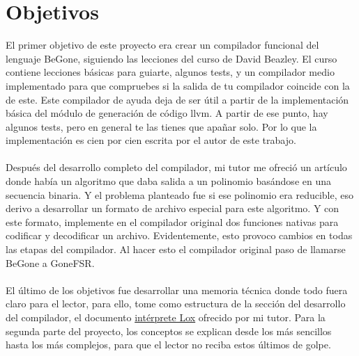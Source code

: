 \section{Objetivos}
El primer objetivo de este proyecto era crear un compilador funcional del lenguaje BeGone, siguiendo las lecciones del curso de David Beazley. El curso contiene lecciones básicas para guiarte, algunos tests, y un compilador medio implementado para que compruebes si la salida de tu compilador coincide con la de este. Este compilador de ayuda deja de ser útil a partir de la implementación básica del módulo de generación de código llvm. A partir de ese punto, hay algunos tests, pero en general te las tienes que apañar solo. Por lo que la implementación es cien por cien escrita por el autor de este trabajo.\\\\
Después del desarrollo completo del compilador, mi tutor me ofreció un artículo \cite{limniotis2007nonlinear} donde había un algoritmo que daba salida a un polinomio basándose en una secuencia binaria. Y el problema planteado fue si ese polinomio era reducible, eso derivo a desarrollar un formato de archivo especial para este algoritmo. Y con este formato, implemente en el compilador original dos funciones nativas para codificar y decodificar un archivo. Evidentemente, esto provoco cambios en todas las etapas del compilador. Al hacer esto el compilador original paso de llamarse BeGone a GoneFSR. \\\\
El último de los objetivos fue desarrollar una memoria técnica donde todo fuera claro para el lector, para ello, tome como estructura de la sección del desarrollo del compilador, el documento \href{https://repositorio.unican.es/xmlui/handle/10902/30046}{intérprete Lox} ofrecido por mi tutor. Para la segunda parte del proyecto, los conceptos se explican desde los más sencillos hasta los más complejos, para que el lector no reciba estos últimos de golpe.

